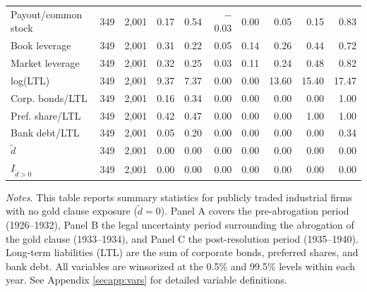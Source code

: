 \begin{table}[p]
\begin{threeparttable}
\begin{tabular}{lrrrrrrrrr}
            Payout/common stock & 349 & 2,001 & 0.17 & 0.54 & $-$0.03 & 0.00 & 0.05 & 0.15 & 0.83 \\
            Book leverage & 349 & 2,001 & 0.31 & 0.22 & 0.05 & 0.14 & 0.26 & 0.44 & 0.72 \\
            Market leverage & 349 & 2,001 & 0.32 & 0.25 & 0.03 & 0.11 & 0.24 & 0.48 & 0.82 \\
            log(LTL) & 349 & 2,001 & 9.37 & 7.37 & 0.00 & 0.00 & 13.60 & 15.40 & 17.47 \\
            Corp. bonds/LTL & 349 & 2,001 & 0.16 & 0.34 & 0.00 & 0.00 & 0.00 & 0.00 & 1.00 \\
            Pref. share/LTL & 349 & 2,001 & 0.42 & 0.47 & 0.00 & 0.00 & 0.00 & 1.00 & 1.00 \\
            Bank debt/LTL & 349 & 2,001 & 0.05 & 0.20 & 0.00 & 0.00 & 0.00 & 0.00 & 0.34 \\
            \ensuremath{\tilde{d}} & 349 & 2,001 & 0.00 & 0.00 & 0.00 & 0.00 & 0.00 & 0.00 & 0.00 \\
            \ensuremath{I_{\tilde{d}>0}} & 349 & 2,001 & 0.00 & 0.00 & 0.00 & 0.00 & 0.00 & 0.00 & 0.00 \\
            \bottomrule
        \end{tabular}
    \end{threeparttable}

    \vspace*{3mm} \justifying \noindent
\scriptsize{\textit{Notes.} This table reports summary statistics for publicly traded industrial firms with no gold clause exposure ($\tilde{d} = 0$). Panel A covers the pre-abrogation period (1926--1932), Panel B the legal uncertainty period surrounding the abrogation of the gold clause (1933--1934), and Panel C the post-resolution period (1935--1940). Long-term liabilities (LTL) are the sum of corporate bonds, preferred shares, and bank debt. All variables are winsorized at the 0.5\% and 99.5\% levels within each year. See Appendix \ref{secapp:vars} for detailed variable definitions.}
\end{table}